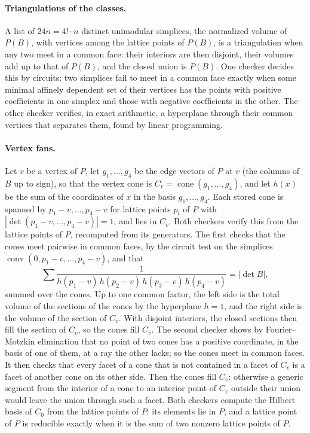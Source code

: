 \documentclass[11pt]{article}
\theoremstyle{definition}
\newcommand{\conv}{\operatorname{conv}}
\begin{document}
\begin{appendices}
\paragraph{Triangulations of the classes.}
A list of $24n=4!\cdot n$ distinct unimodular simplices, the normalized
volume of $P(B)$, with vertices among the lattice points of $P(B)$, is a
triangulation when any two meet in a common face: their interiors are then
disjoint, their volumes add up to that of $P(B)$, and the closed union is
$P(B)$. One checker decides this by circuits: two simplices fail to meet in
a common face exactly when some minimal affinely dependent set of their
vertices has the points with positive coefficients in one simplex and those
with negative coefficients in the other. The other checker verifies, in
exact arithmetic, a hyperplane through their common vertices that separates
them, found by linear programming.

\paragraph{Vertex fans.}
Let $v$ be a vertex of $P$, let $g_1,\dots,g_4$ be the edge vectors of $P$
at $v$ (the columns of $B$ up to sign), so that the vertex cone is
$C_v=\operatorname{cone}(g_1,\dots,g_4)$, and let $h(x)$ be the sum of the
coordinates of $x$ in the basis $g_1,\dots,g_4$. Each stored cone is spanned
by $p_1-v,\dots,p_4-v$ for lattice points $p_i$ of $P$ with
$|\det(p_1-v,\dots,p_4-v)|=1$, and lies in $C_v$. Both checkers verify this
from the lattice points of $P$, recomputed from its generators. The first
checks that the cones meet pairwise in common faces, by the circuit test on
the simplices $\conv(0,p_1-v,\dots,p_4-v)$, and that
\[
\sum\frac{1}{h(p_1-v)\,h(p_2-v)\,h(p_3-v)\,h(p_4-v)}=|\det B|,
\]
summed over the cones. Up to one common factor, the left side is the total
volume of the sections of the cones by the hyperplane $h=1$, and the right
side is the volume of the section of $C_v$. With disjoint interiors, the
closed sections then fill the section of $C_v$, so the cones fill $C_v$.
The second checker shows by Fourier--Motzkin elimination that no point of
two cones has a positive coordinate, in the basis of one of them, at a ray
the other lacks; so the cones meet in common faces. It then checks that
every facet of a cone that is not contained in a facet of $C_v$ is a facet of
another cone on its other side. Then the cones fill $C_v$: otherwise a
generic segment from the interior of a cone to an interior point of $C_v$
outside their union would leave the union through such a facet.
Both checkers compute the Hilbert basis of $C_0$ from the lattice points of
$P$: its elements lie in $P$, and a lattice point of $P$ is reducible exactly
when it is the sum of two nonzero lattice points of $P$.


\end{appendices}
\end{document}
